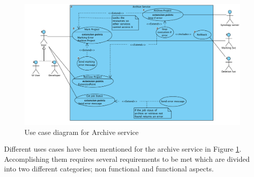  \begin{figure}[H]
    \centering \includegraphics[scale=0.6, angle=90, origin=c]{grafiken/archiveUseCase.png}
    \caption{Use case diagram for Archive service}
    \label{fig:archiveUseCase}
\end{figure}
 
Different uses cases have been mentioned for the archive service in Figure \ref{fig:archiveUseCase}. Accomplishing them requires several requirements to be met
which are divided into two different categories; non functional and functional aspects. 


